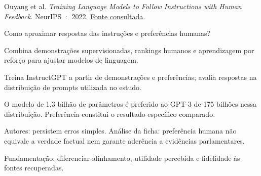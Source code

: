 {\small Ouyang et al. \textit{Training Language Models to Follow Instructions with Human Feedback}. NeurIPS · 2022. \href{https://proceedings.neurips.cc/paper_files/paper/2022/file/b1efde53be364a73914f58805a001731-Paper-Conference.pdf}{Fonte consultada}.\par}

Como aproximar respostas das instruções e preferências humanas?

Combina demonstrações supervisionadas, rankings humanos e aprendizagem por reforço para ajustar modelos de linguagem.

Treina InstructGPT a partir de demonstrações e preferências; avalia respostas na distribuição de prompts utilizada no estudo.

O modelo de 1,3 bilhão de parâmetros é preferido ao GPT-3 de 175 bilhões nessa distribuição. Preferência constitui o resultado específico comparado.

\begin{itemize}
\end{itemize}

Autores: persistem erros simples. Análise da ficha: preferência humana não equivale a verdade factual nem garante aderência a evidências parlamentares.

Fundamentação: diferenciar alinhamento, utilidade percebida e fidelidade às fontes recuperadas.

